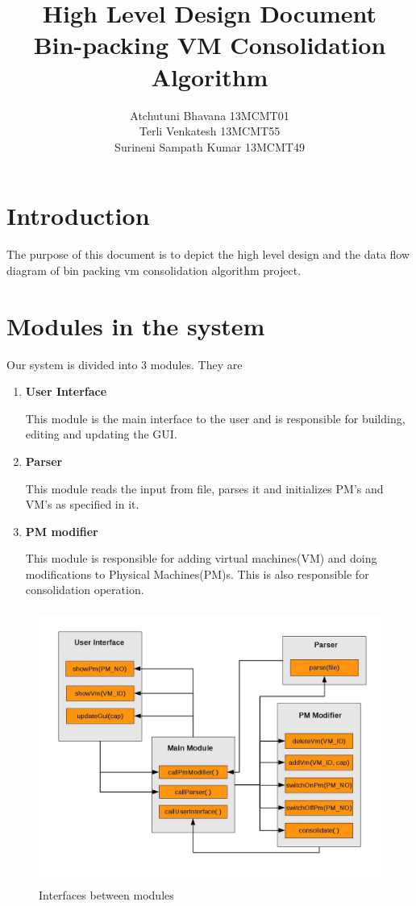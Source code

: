 \documentclass[a4paper,11pt]{article}
\title{High Level Design Document \\ Bin-packing VM Consolidation Algorithm}
\author{Atchutuni Bhavana 13MCMT01  \\ Terli Venkatesh 13MCMT55 \\ Surineni Sampath Kumar 13MCMT49}
\date{}
\begin{document}
\maketitle
\pagebreak
\tableofcontents
\pagebreak

\section{Introduction}
The purpose of this document is to depict the high level
design and the data flow diagram of bin packing
vm consolidation algorithm project.
\section{Modules in the system}
Our system is divided into 3 modules. They are
\begin{enumerate}
\item \textbf{ User Interface }

This module is the main interface to the user and is responsible for building, editing and updating the GUI.
\item \textbf{ Parser }

This module reads the input from file, parses it and initializes PM’s and VM’s as specified in it.
\item \textbf{ PM modifier }

This module is responsible for adding virtual machines(VM) and doing modifications to Physical Machines(PM)s. This is also responsible for consolidation operation.

\end{enumerate}

\begin{figure}[h]
\centering
\includegraphics[height=9cm]{images/intrfc.jpg} 
\caption{Interfaces between modules}
\label{fig:interfaces}

\end{figure}
\end{document}
